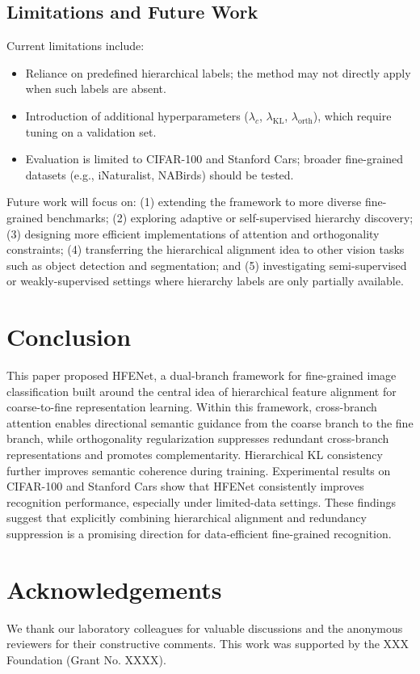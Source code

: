 \documentclass[pdflatex,iicol,sn-mathphys-num]{sn-jnl}
\theoremstyle{thmstyleone}%
\theoremstyle{thmstyletwo}%
\theoremstyle{thmstylethree}%
\begin{document}
\subsection{Limitations and Future Work}
Current limitations include:
\begin{itemize}
    \item Reliance on predefined hierarchical labels; the method may not directly apply when such labels are absent.
    \item Introduction of additional hyperparameters ($\lambda_c$, $\lambda_{\mathrm{KL}}$, $\lambda_{\mathrm{orth}}$), which require tuning on a validation set.
    \item Evaluation is limited to CIFAR-100 and Stanford Cars; broader fine-grained datasets (e.g., iNaturalist, NABirds) should be tested.
\end{itemize}
Future work will focus on: (1) extending the framework to more diverse fine-grained benchmarks; (2) exploring adaptive or self-supervised hierarchy discovery; (3) designing more efficient implementations of attention and orthogonality constraints; (4) transferring the hierarchical alignment idea to other vision tasks such as object detection and segmentation; and (5) investigating semi-supervised or weakly-supervised settings where hierarchy labels are only partially available.

\section{Conclusion}
\label{sec:conclusion}
This paper proposed HFENet, a dual-branch framework for fine-grained image classification built around the central idea of hierarchical feature alignment for coarse-to-fine representation learning. 
Within this framework, cross-branch attention enables directional semantic guidance from the coarse branch to the fine branch, while orthogonality regularization suppresses redundant cross-branch representations and promotes complementarity. 
Hierarchical KL consistency further improves semantic coherence during training. 
Experimental results on CIFAR-100 and Stanford Cars show that HFENet consistently improves recognition performance, especially under limited-data settings. 
These findings suggest that explicitly combining hierarchical alignment and redundancy suppression is a promising direction for data-efficient fine-grained recognition.

\section*{Acknowledgements}
We thank our laboratory colleagues for valuable discussions and the anonymous reviewers for their constructive comments. This work was supported by the XXX Foundation (Grant No. XXXX).
\end{document}
